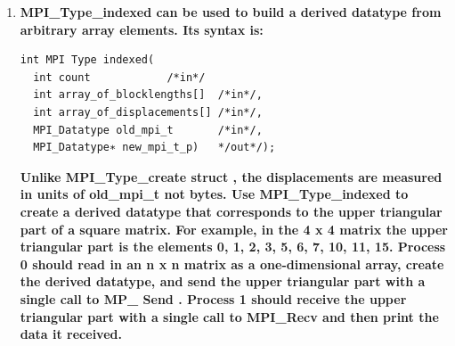 \documentclass[a4paper,12pt]{article}
\begin{document}
\begin{enumerate}
El código es el siguiente:

\begin{lstlisting}
#include <stdio.h>
#include <stdlib.h>
#include <mpi.h>
#include "../utils.h"

int main(){
	int my_rank;
	int comm_sz;
	int n = 10;
	MPI_Init(NULL,NULL);
	MPI_Comm_size(MPI_COMM_WORLD,&comm_sz);
	MPI_Comm_rank(MPI_COMM_WORLD,&my_rank);
	MPI_Datatype data;
	int local_n  = n / comm_sz;
	int * vector = getRandomVector(n);
	int * local_vector = (int*) malloc(sizeof(int) * local_n);
	int * res_vector = (int*) malloc(sizeof(int) * n);
	MPI_Type_vector(1,local_n,n + 1,MPI_INT,&data);
	MPI_Type_commit(&data);
	if(my_rank == 0){
		printVector(vector,n);
		for(int i = 0; i < local_n;i++){
			local_vector[i] = vector[i];
		}
		for(int i = 1; i < comm_sz; i++){
			MPI_Send(&vector[i * local_n],1,data,i,0,MPI_COMM_WORLD);
		}
	}
	else{
		MPI_Recv(local_vector,1,data,0,0,MPI_COMM_WORLD,MPI_STATUS_IGNORE);
	}

	for(int i = 0; i < local_n; i++){
		local_vector[i] = local_vector[i] * 2;
	}

	if(my_rank != 0){
		MPI_Send(local_vector,1,data,0,0,MPI_COMM_WORLD);
	}
	else{
		for(int i = 0; i < local_n; i++){
			res_vector[i] = local_vector[i];
		}
		for(int i = 1; i < comm_sz; i++){
			MPI_Recv(&res_vector[i * local_n],1,data,i,0,MPI_COMM_WORLD,MPI_STATUS_IGNORE);
		}
		printVector(res_vector,n);
	}
	MPI_Finalize();
	return 0;
}
\end{lstlisting}

\item{\textbf{MPI\_Type\_indexed can be used to build a derived datatype from arbitrary array elements. Its syntax is:}
\begin{lstlisting}
int MPI Type indexed(
  int count		       /*in*/
  int array_of_blocklengths[]  /*in*/,
  int array_of_displacements[] /*in*/,
  MPI_Datatype old_mpi_t       /*in*/,
  MPI_Datatype∗ new_mpi_t_p)   */out*/);
\end{lstlisting}
\textbf{Unlike MPI\_Type\_create struct , the displacements are measured in units of old\_mpi\_t not bytes.
Use MPI\_Type\_indexed to create a derived datatype that corresponds to the upper triangular part of a square matrix.
For example, in the 4 x 4 matrix the upper triangular part is the elements 0, 1, 2, 3, 5, 6, 7, 10, 11, 15. Process 
0 should read in an n x n matrix as a one-dimensional array, create the derived datatype, and send the upper
triangular part with a single call to MP\_ Send . Process 1 should receive the upper triangular part with a single
call to MPI\_Recv and then print the data it received.}
}


\end{enumerate}
\end{document}
